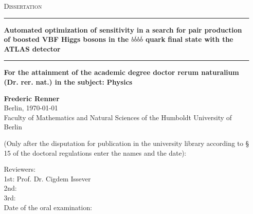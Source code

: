 
\begin{titlepage}
	\begin{center}
		{\scshape\Large Dissertation\\}
		\vspace{.2cm}
		\rule[1pt]{\textwidth}{2pt}
		\LARGE{\textbf{Automated optimization of sensitivity in a search for pair production of boosted VBF Higgs bosons in the $b\overline{b}b\overline{b}$ quark final state with the ATLAS detector
			}}
		\rule[11pt]{\textwidth}{2pt}

		{\normalsize\textbf{For the attainment of the academic degree doctor rerum naturalium (Dr. rer. nat.) in the subject: Physics}}
		\vspace{2cm}

		\Large{\textbf{Frederic Renner\\}}
		Berlin, \today\\
		\vspace{2cm}
		\large
		Faculty of Mathematics and Natural Sciences of the Humboldt University of Berlin\\
		\vspace{4cm}


		\newpage
		(Only after the disputation for publication in the university library according to § 15	of the doctoral regulations enter the names and the date):\\
		\raggedright
		Reviewers: \\
		1st: Prof. Dr. Cigdem Issever\\
		2nd: \\
		3rd: \\

		Date of the oral examination:
	\end{center}
\end{titlepage}